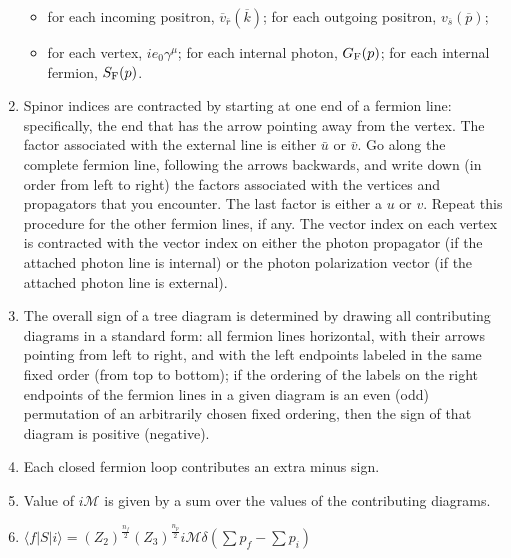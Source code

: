 \begin{enumerate}
\begin{itemize}
\item for each incoming positron, $\overline{v}_{\overline{r}}(\overline{k})$; for each outgoing positron, $v_{\overline{s}}(\overline{p})$;
\item for each vertex, $ie_0 \gamma^{\mu}$;
for each internal photon, $G_{\rm F}(p)$;
for each internal fermion, $S_{\rm F}(p)$.
\end{itemize}
\item Spinor indices are contracted by starting at one end of a fermion line: specifically, the end that has the arrow pointing away from the vertex. The factor associated with the external line is either $\bar{u}$ or $\bar{v}$. Go along the complete fermion line, following the arrows backwards, and write down (in order from left to right) the factors associated with the vertices and propagators that you encounter. The last factor is either a $u$ or $v$. Repeat this procedure for the other fermion lines, if any. The vector index on each vertex is contracted with the vector index on either the photon propagator (if the attached photon line is internal) or the photon polarization vector (if the attached photon line is external).
\item The overall sign of a tree diagram is determined by drawing all contributing diagrams in a standard form: all fermion lines horizontal, with their arrows pointing from left to right, and with the left endpoints labeled in the same fixed order (from top to bottom); if the ordering of the labels on the right endpoints of the fermion lines in a given diagram is an even (odd) permutation of an arbitrarily chosen fixed ordering, then the sign of that diagram is positive (negative).
\item Each closed fermion loop contributes an extra minus sign.
\item Value of $i\mathcal{M}$ is given by a sum over the values of the contributing diagrams.
\item $\langle f | S | i \rangle = (Z_2)^{\frac{n_f}{2}} (Z_3)^{\frac{n_p}{2}} i\mathcal{M}\delta(\sum p_f -\sum p_i)$
\end{enumerate}

